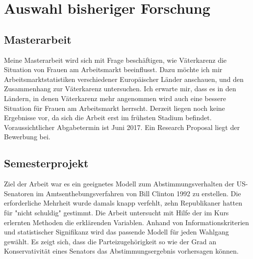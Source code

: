 \documentclass[11pt,a4paper,sans]{moderncv}
\begin{document}
%


\clearpage
\makecvtitle
\section{Auswahl bisheriger Forschung}
\subsection{Masterarbeit}
Meine Masterarbeit wird sich mit Frage beschäftigen, wie Väterkarenz die Situation von Frauen am Arbeitsmarkt beeinflusst. Dazu möchte ich mir Arbeitsmarktstatistiken verschiedener Europäischer Länder anschauen, und den Zusammenhang zur Väterkarenz untersuchen. Ich erwarte mir, dass es in den Ländern, in denen Väterkarenz mehr angenommen wird auch eine bessere Situation für Frauen am Arbeitsmarkt herrscht. Derzeit liegen noch keine Ergebnisse vor, da sich die Arbeit erst im frühsten Stadium befindet. Voraussichtlicher Abgabetermin ist Juni 2017. Ein Research Proposal liegt der Bewerbung bei. 
\subsection{Semesterprojekt}
Ziel der Arbeit war es ein geeignetes Modell zum  Abstimmungsverhalten der US-Senatoren im Amtsenthebungsverfahren von Bill Clinton 1992  zu erstellen. Die erforderliche Mehrheit wurde damals knapp verfehlt, zehn Republikaner hatten für "nicht schuldig" gestimmt. Die Arbeit untersucht mit Hilfe der im  Kurs erlernten Methoden die erklärenden Variablen. Anhand von Informationskriterien und statistischer Signifikanz wird das passende Modell für jeden Wahlgang gewählt. Es zeigt sich, dass die Parteizugehörigkeit so wie der Grad an Konservativität eines Senators das Abstimmungsergebnis vorhersagen können.
\end{document}
